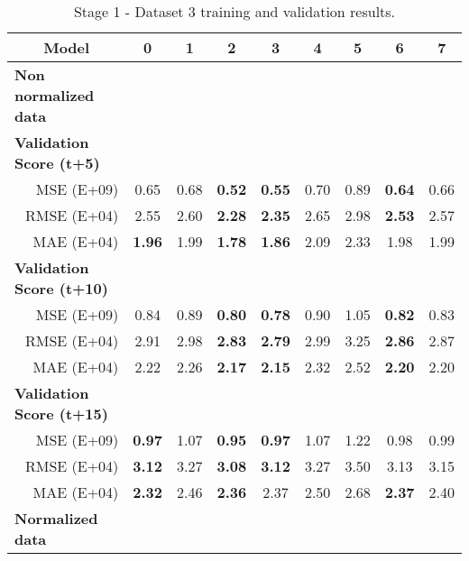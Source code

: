 \begin{table}[htbp]
  \centering
  \caption{Stage 1 - Dataset 3 training and validation results.}
    \begin{tabular}{r|cccccccc}
        \toprule
        \multicolumn{1}{c}{\textbf{Model}} & 0     & 1     & 2     & 3     & 4     & 5     & 6     & 7 \\
        \midrule
        \multicolumn{1}{l|}{\textbf{Non normalized data}} &       &       &       &       &       &       &       &  \\
        \multicolumn{1}{l|}{\textbf{            Validation Score (t+5)      }} &       &       &       &       &       &       &       &  \\
        MSE (E+09)   & 0.65  & 0.68  & \textbf{0.52} & \textbf{0.55} & 0.70  & 0.89  & \textbf{0.64} & 0.66 \\
        RMSE (E+04)   & 2.55  & 2.60  & \textbf{2.28} & \textbf{2.35} & 2.65  & 2.98  & \textbf{2.53} & 2.57 \\
        MAE (E+04)   & \textbf{1.96} & 1.99  & \textbf{1.78} & \textbf{1.86} & 2.09  & 2.33  & 1.98  & 1.99 \\
        \multicolumn{1}{l|}{\textbf{            Validation Score (t+10)               }} &       &       &       &       &       &       &       &  \\
        MSE (E+09)   & 0.84  & 0.89  & \textbf{0.80} & \textbf{0.78} & 0.90  & 1.05  & \textbf{0.82} & 0.83 \\
        RMSE (E+04)   & 2.91  & 2.98  & \textbf{2.83} & \textbf{2.79} & 2.99  & 3.25  & \textbf{2.86} & 2.87 \\
        MAE (E+04)   & 2.22  & 2.26  & \textbf{2.17} & \textbf{2.15} & 2.32  & 2.52  & \textbf{2.20} & 2.20 \\
        \multicolumn{1}{l|}{\textbf{            Validation Score (t+15)               }} &       &       &       &       &       &       &       &  \\
        MSE (E+09)   & \textbf{0.97} & 1.07  & \textbf{0.95} & \textbf{0.97} & 1.07  & 1.22  & 0.98  & 0.99 \\
        RMSE (E+04)   & \textbf{3.12} & 3.27  & \textbf{3.08} & \textbf{3.12} & 3.27  & 3.50  & 3.13  & 3.15 \\
        MAE (E+04)   & \textbf{2.32} & 2.46  & \textbf{2.36} & 2.37  & 2.50  & 2.68  & \textbf{2.37} & 2.40 \\
        \midrule
        \multicolumn{1}{l|}{\textbf{Normalized data}} &       &       &       &       &       &       &       &  \\

\end{tabular}
\end{table}
